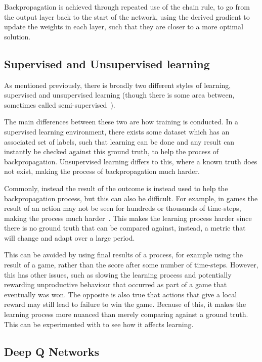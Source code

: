 Backpropagation is achieved through repeated use of the chain rule, to go from
the output layer back to the start of the network, using the derived gradient to
update the weights in each layer, such that they are closer to a more optimal
solution.


\subsection{Supervised and Unsupervised learning}

As mentioned previously, there is broadly two different styles of learning,
supervised and unsupervised learning (though there is some area between,
sometimes called semi-supervised~\cite{chapelle2009semi}).

The main differences between these two are how training is conducted. In a
supervised learning environment, there exists some dataset which has an
associated set of labels, such that learning can be done and any result can
instantly be checked against this ground truth, to help the process of
backpropagation. Unsupervised learning differs to this, where a known truth does
not exist, making the process of backpropagation much harder.

Commonly, instead the result of the outcome is instead used to help the
backpropagation process, but this can also be difficult. For example, in games
the result of an action may not be seen for hundreds or thousands of time-steps,
making the process much harder~\cite{sutton1984temporal}. This makes the
learning process harder since there is no ground truth that can be compared
against, instead, a metric that will change and adapt over a large period.

This can be avoided by using final results of a process, for example using the
result of a game, rather than the score after some number of time-steps.
However, this has other issues, such as slowing the learning process and
potentially rewarding unproductive behaviour that occurred as part of a game
that eventually was won. The opposite is also true that actions that give a
local reward may still lead to failure to win the game. Because of this, it
makes the learning process more nuanced than merely comparing against a ground
truth. This can be experimented with to see how it affects learning.

\subsection{Deep Q Networks}

